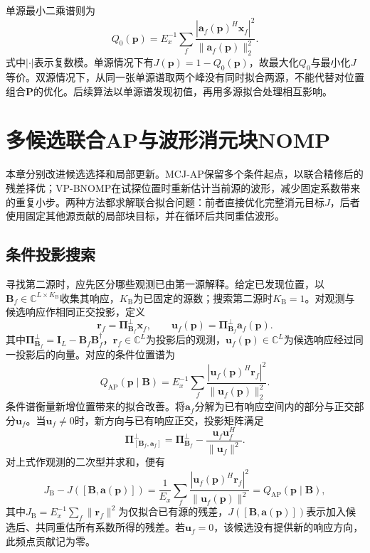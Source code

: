 \documentclass[a4paper,fleqn]{cas-sc}
\numberwithin{equation}{section}
\numberwithin{figure}{section}
\numberwithin{table}{section}
\newcommand{\C}{\mathbb C}
\begin{document}
单源最小二乘谱则为
\begin{equation}
 Q_0(\bm p)=E_x^{-1}\sum_f
 \frac{|\bm a_f(\bm p)^H\bm x_f|^2}{\|\bm a_f(\bm p)\|_2^2} .\label{eq:single}
\end{equation}
式中$|\cdot|$表示复数模。单源情况下有$J(\bm p)=1-Q_0(\bm p)$，故最大化$Q_0$与最小化$J$等价。双源情况下，从同一张单源谱取两个峰没有同时拟合两源，不能代替对位置组合$\bm P$的优化。后续算法以单源谱发现初值，再用多源拟合处理相互影响。



\section{多候选联合AP与波形消元块NOMP}\label{sec:methods}
本章分别改进候选选择和局部更新。MCJ-AP保留多个条件起点，以联合精修后的残差择优；VP-BNOMP在试探位置时重新估计当前源的波形，减少固定系数带来的重复小步。两种方法都求解联合拟合问题：前者直接优化完整消元目标$J$，后者使用固定其他源贡献的局部块目标，并在循环后共同重估波形。
\subsection{条件投影搜索}
寻找第二源时，应先区分哪些观测已由第一源解释。给定已发现位置，以$\bm B_f\in\C^{L\times K_{\mathrm B}}$收集其响应，$K_{\mathrm B}$为已固定的源数；搜索第二源时$K_{\mathrm B}=1$。对观测与候选响应作相同正交投影，定义
\begin{equation}
 \bm r_f=\bm\Pi_{\bm B_f}^{\perp}\bm x_f,\qquad
 \bm u_f(\bm p)=\bm\Pi_{\bm B_f}^{\perp}\bm a_f(\bm p).
\end{equation}
其中$\bm\Pi_{\bm B_f}^{\perp}=\bm I_L-\bm B_f\bm B_f^\dagger$，$\bm r_f\in\C^L$为投影后的观测，$\bm u_f(\bm p)\in\C^L$为候选响应经过同一投影后的向量。对应的条件位置谱为
\begin{equation}
 Q_{\mathrm{AP}}(\bm p\mid\bm B)
 =E_x^{-1}\sum_f\frac{|\bm u_f(\bm p)^H\bm r_f|^2}
 {\|\bm u_f(\bm p)\|_2^2}.\label{eq:conditional}
\end{equation}
条件谱衡量新增位置带来的拟合改善。将$\bm a_f$分解为已有响应空间内的部分与正交部分$\bm u_f$。当$\bm u_f\ne0$时，新方向与已有响应正交，投影矩阵满足
\begin{equation}
 \bm\Pi_{[\bm B_f,\bm a_f]}^{\perp}
 =\bm\Pi_{\bm B_f}^{\perp}
 -\frac{\bm u_f\bm u_f^H}{\|\bm u_f\|^2} .
\end{equation}
对上式作观测的二次型并求和，便有
\begin{equation}
 J_{\mathrm B}-J([\bm B,\bm a(\bm p)])
 =\frac1{E_x}\sum_f\frac{|\bm u_f(\bm p)^H\bm r_f|^2}
 {\|\bm u_f(\bm p)\|^2}
 =Q_{\mathrm{AP}}(\bm p\mid\bm B),\label{eq:conditionalGain}
\end{equation}
其中$J_{\mathrm B}=E_x^{-1}\sum_f\|\bm r_f\|^2$为仅拟合已有源的残差，$J([\bm B,\bm a(\bm p)])$表示加入候选后、共同重估所有系数所得的残差。若$\bm u_f=0$，该候选没有提供新的响应方向，此频点贡献记为零。
\end{document}
